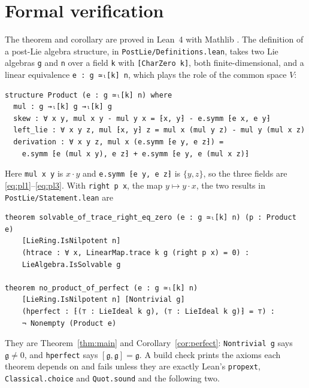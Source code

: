 \documentclass[11pt]{article}
\theoremstyle{definition}
\theoremstyle{remark}
\newcommand{\g}{\mathfrak{g}}
\begin{document}
\section{Formal verification}\label{sec:lean}
The theorem and corollary are proved in Lean~4 \cite{Lean} with Mathlib
\cite{Mathlib}. The definition of a post-Lie algebra structure, in
\texttt{PostLie/Definitions.lean}, takes two Lie algebras \texttt{g} and
\texttt{n} over a field \texttt{k} with \texttt{[CharZero k]}, both
finite-dimensional, and a linear equivalence \texttt{e : g ≃ₗ[k] n},
which plays the role of the common space $V$:
\begin{verbatim}
structure Product (e : g ≃ₗ[k] n) where
  mul : g →ₗ[k] g →ₗ[k] g
  skew : ∀ x y, mul x y - mul y x = ⁅x, y⁆ - e.symm ⁅e x, e y⁆
  left_lie : ∀ x y z, mul ⁅x, y⁆ z = mul x (mul y z) - mul y (mul x z)
  derivation : ∀ x y z, mul x (e.symm ⁅e y, e z⁆) =
    e.symm ⁅e (mul x y), e z⁆ + e.symm ⁅e y, e (mul x z)⁆
\end{verbatim}
Here \texttt{mul x y} is $x\cdot y$ and \texttt{e.symm ⁅e y, e z⁆} is
$\{y,z\}$, so the three fields are \eqref{eq:pl1}--\eqref{eq:pl3}. With
\texttt{right p x}, the map $y\mapsto y\cdot x$, the two results in
\texttt{PostLie/Statement.lean} are
\begin{verbatim}
theorem solvable_of_trace_right_eq_zero (e : g ≃ₗ[k] n) (p : Product e)
    [LieRing.IsNilpotent n]
    (htrace : ∀ x, LinearMap.trace k g (right p x) = 0) :
    LieAlgebra.IsSolvable g

theorem no_product_of_perfect (e : g ≃ₗ[k] n)
    [LieRing.IsNilpotent n] [Nontrivial g]
    (hperfect : ⁅(⊤ : LieIdeal k g), (⊤ : LieIdeal k g)⁆ = ⊤) :
    ¬ Nonempty (Product e)
\end{verbatim}
They are Theorem~\ref{thm:main} and Corollary~\ref{cor:perfect}:
\texttt{Nontrivial g} says $\g\ne0$, and \texttt{hperfect} says
$[\g,\g]=\g$. A build check prints the axioms each theorem depends on and
fails unless they are exactly Lean's \texttt{propext},
\texttt{Classical.choice} and \texttt{Quot.sound} and the following two.
\end{document}
